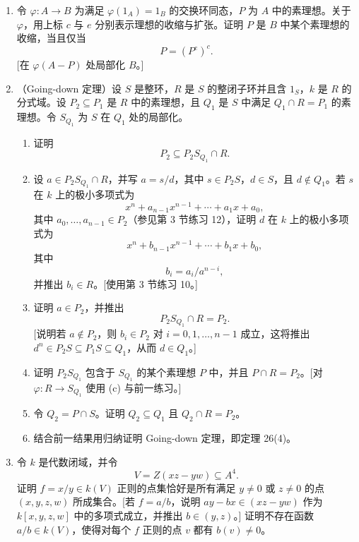 \begin{enumerate}[label=\arabic*.]
	\item 令 $\varphi:A\to B$ 为满足 $\varphi(1_A)=1_B$ 的交换环同态，$P$ 为 $A$ 中的素理想。关于 $\varphi$，用上标 $c$ 与 $e$ 分别表示理想的收缩与扩张。证明 $P$ 是 $B$ 中某个素理想的收缩，当且仅当
	\[
	P=(P^e)^c.
	\]
	[在 $\varphi(A-P)$ 处局部化 $B$。]
	
	\item （Going-down 定理）设 $S$ 是整环，$R$ 是 $S$ 的整闭子环并且含 $1_S$，$k$ 是 $R$ 的分式域。设 $P_2\subseteq P_1$ 是 $R$ 中的素理想，且 $Q_1$ 是 $S$ 中满足 $Q_1\cap R=P_1$ 的素理想。令 $S_{Q_1}$ 为 $S$ 在 $Q_1$ 处的局部化。
	\begin{enumerate}[label=(\alph*)]
		\item 证明
		\[
		P_2\subseteq P_2S_{Q_1}\cap R.
		\]
		\item 设 $a\in P_2S_{Q_1}\cap R$，并写 $a=s/d$，其中 $s\in P_2S$，$d\in S$，且 $d\notin Q_1$。若 $s$ 在 $k$ 上的极小多项式为
		\[
		x^n+a_{n-1}x^{n-1}+\cdots+a_1x+a_0,
		\]
		其中 $a_0,\ldots,a_{n-1}\in P_2$（参见第 3 节练习 12），证明 $d$ 在 $k$ 上的极小多项式为
		\[
		x^n+b_{n-1}x^{n-1}+\cdots+b_1x+b_0,
		\]
		其中
		\[
		b_i=a_i/a^{n-i},
		\]
		并推出 $b_i\in R$。[使用第 3 节练习 10。]
		\item 证明 $a\in P_2$，并推出
		\[
		P_2S_{Q_1}\cap R=P_2.
		\]
		[说明若 $a\notin P_2$，则 $b_i\in P_2$ 对 $i=0,1,\ldots,n-1$ 成立，这将推出 $d^n\in P_2S\subseteq P_1S\subseteq Q_1$，从而 $d\in Q_1$。]
		\item 证明 $P_2S_{Q_1}$ 包含于 $S_{Q_1}$ 的某个素理想 $P$ 中，并且 $P\cap R=P_2$。[对 $\varphi:R\to S_{Q_1}$ 使用 (c) 与前一练习。]
		\item 令 $Q_2=P\cap S$。证明 $Q_2\subseteq Q_1$ 且 $Q_2\cap R=P_2$。
		\item 结合前一结果用归纳证明 Going-down 定理，即定理 26(4)。
	\end{enumerate}
	
	\item 令 $k$ 是代数闭域，并令
	\[
	V=Z(xz-yw)\subseteq A^4.
	\]
	证明 $f=x/y\in k(V)$ 正则的点集恰好是所有满足 $y\ne0$ 或 $z\ne0$ 的点 $(x,y,z,w)$ 所成集合。[若 $f=a/b$，说明 $ay-bx\in(xz-yw)$ 作为 $k[x,y,z,w]$ 中的多项式成立，并推出 $b\in(y,z)$。] 证明不存在函数 $a/b\in k(V)$，使得对每个 $f$ 正则的点 $v$ 都有 $b(v)\ne0$。
	

\end{enumerate}
